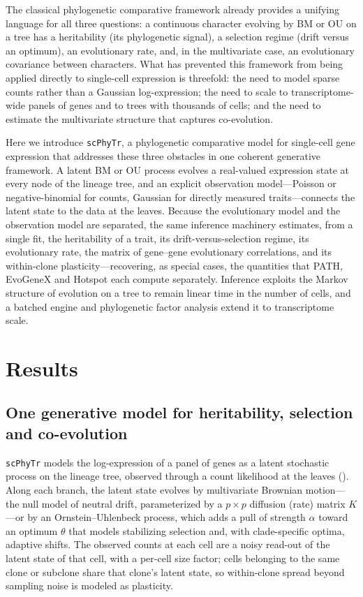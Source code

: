 \documentclass{article}
\newcommand{\scphytr}{\texttt{scPhyTr}}
\begin{document}
The classical phylogenetic comparative framework already provides a unifying language for
all three questions: a continuous character evolving by BM or OU on a tree has a
heritability (its phylogenetic signal), a selection regime (drift versus an optimum), an
evolutionary rate, and, in the multivariate case, an evolutionary covariance between
characters. What has prevented this framework from being applied directly to single-cell
expression is threefold: the need to model sparse counts rather than a Gaussian
log-expression; the need to scale to transcriptome-wide panels of genes and to trees with
thousands of cells; and the need to estimate the multivariate structure that captures
co-evolution.

Here we introduce \scphytr{}, a phylogenetic comparative model for single-cell gene
expression that addresses these three obstacles in one coherent generative framework. A
latent BM or OU process evolves a real-valued expression state at every node of the
lineage tree, and an explicit observation model---Poisson or negative-binomial for counts,
Gaussian for directly measured traits---connects the latent state to the data at the
leaves. Because the evolutionary model and the observation model are separated, the same
inference machinery estimates, from a single fit, the heritability of a trait, its
drift-versus-selection regime, its evolutionary rate, the matrix of gene--gene
evolutionary correlations, and its within-clone plasticity---recovering, as special cases,
the quantities that PATH, EvoGeneX and Hotspot each compute separately. Inference exploits
the Markov structure of evolution on a tree to remain linear time in the number of cells,
and a batched engine and phylogenetic factor analysis extend it to transcriptome scale.

\section*{Results}
\label{sec:results}

\subsection*{One generative model for heritability, selection and co-evolution}

\scphytr{} models the log-expression of a panel of genes as a latent stochastic process
on the lineage tree, observed through a count likelihood at the leaves
(). Along each branch, the latent state evolves by multivariate
Brownian motion---the null model of neutral drift, parameterized by a $p\times p$
diffusion (rate) matrix $K$---or by an Ornstein--Uhlenbeck process, which adds a pull of
strength $\alpha$ toward an optimum $\theta$ that models stabilizing selection and, with
clade-specific optima, adaptive shifts. The observed counts at each cell are a noisy
read-out of the latent state of that cell, with a per-cell size factor; cells belonging to
the same clone or subclone share that clone's latent state, so within-clone spread beyond
sampling noise is modeled as plasticity.
\end{document}
